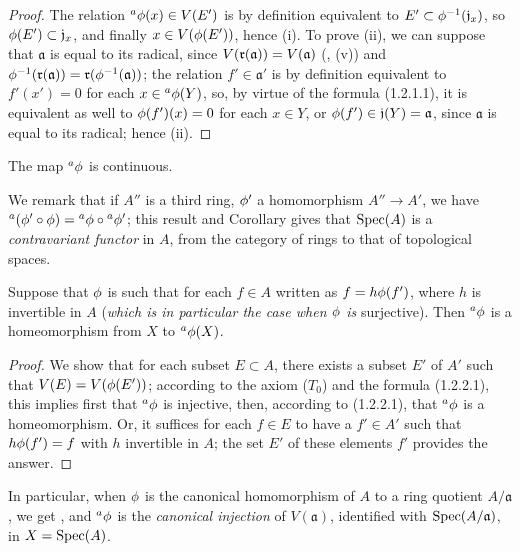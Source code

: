 \begin{proof}
\label{proof-1.1.2.2}
The relation ${}^a\phi(x)\in V(E')$ is by definition equivalent to
$E'\subset\phi^{-1}(\mathfrak{j}_x)$, so $\phi(E')\subset\mathfrak{j}_x$, and
finally $x\in V(\phi(E'))$, hence (i). To prove (ii), we can suppose that
$\mathfrak{a}$ is equal to its radical, since $V(\mathfrak{r}(\mathfrak{a}))=V(\mathfrak{a})$
(, (v)) and
$\phi^{-1}(\mathfrak{r}(\mathfrak{a}))=\mathfrak{r}(\phi^{-1}(\mathfrak{a}))$; the relation
$f'\in\mathfrak{a}'$ is by definition equivalent to $f'(x')=0$ for each
$x\in{{}^a\phi(Y)}$, so, by virtue of the formula (1.2.1.1), it is equivalent as well
to $\phi(f')(x)=0$ for each $x\in Y$, or $\phi(f')\in\mathfrak{j}(Y)=\mathfrak{a}$,
since $\mathfrak{a}$ is equal to its radical; hence (ii).
\end{proof}

\begin{cor}[1.2.3]
\label{1.1.2.3}
The map ${}^a\phi$ is continuous.
\end{cor}

We remark that if $A''$ is a third ring, $\phi'$ a homomorphism $A''\to A'$, we have
${}^a(\phi'\circ\phi)={}^a\phi\circ{}^a\phi'$; this result and Corollary
 gives that ${\mathop{\mathrm{Spec}}\nolimits}(A)$ is a {\em contravariant functor} in $A$, from the
category of rings to that of topological spaces.

\begin{cor}[1.2.4]
\label{1.1.2.4}
Suppose that $\phi$ is such that for each $f\in A$ written as $f=h\phi(f')$, where $h$ is
invertible in $A$ ({\em which is in particular the case when $\phi$ is} surjective). Then
${}^a\phi$ is a homeomorphism from $X$ to ${}^a\phi(X)$.
\end{cor}

\begin{proof}
\label{proof-1.1.2.4}
We show that for each subset $E\subset A$, there exists a subset $E'$ of $A'$ such that
$V(E)=V(\phi(E'))$; according to the axiom ($T_0$)  and the formula
(1.2.2.1), this implies first that ${}^a\phi$ is injective, then, according to (1.2.2.1),
that ${}^a\phi$ is a homeomorphism. Or, it suffices for each $f\in E$ to have a $f'\in A'$
such that $h\phi(f')=f$ with $h$ invertible in $A$; the set $E'$ of these elements $f'$
provides the answer.
\end{proof}

\begin{env}[1.2.5]
\label{1.1.2.5}
In particular, when $\phi$ is the canonical homomorphism of $A$ to a ring quotient
$A/\mathfrak{a}$, we get , and ${}^a\phi$ is the
{\em canonical injection} of $V(\mathfrak{a})$, identified with ${\mathop{\mathrm{Spec}}\nolimits}(A/\mathfrak{a})$,
in $X={\mathop{\mathrm{Spec}}\nolimits}(A)$.
\end{env}

